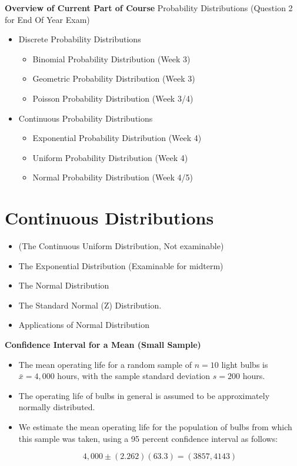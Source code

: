 \documentclass[]{report}
\begin{document}
{
\textbf{Overview of Current Part of Course}
Probability Distributions (Question 2 for End Of Year Exam)
\begin{itemize}
\item  Discrete Probability Distributions
\begin{itemize}
\item  Binomial Probability Distribution (Week 3)
\item  Geometric Probability Distribution (Week 3)
\item  Poisson Probability Distribution (Week 3/4)
\end{itemize}

\item  Continuous Probability Distributions
\begin{itemize}
\item  Exponential Probability Distribution (Week 4)
\item  Uniform Probability Distribution (Week 4)
\item  Normal Probability Distribution (Week 4/5)
\end{itemize}
\end{itemize}
}






\section{Continuous Distributions}
\begin{itemize}
\item  (The Continuous Uniform Distribution, Not examinable)
\item  The Exponential Distribution (Examinable for midterm)
\item  The Normal Distribution
\item  The Standard Normal (Z) Distribution.
\item  Applications of Normal Distribution
\end{itemize}


\textbf{Confidence Interval for a Mean (Small Sample)}
\begin{itemize}
\item  The mean operating life for a random sample of $n = 10$ light bulbs is $\bar{x} = 4,000$ hours, with the sample
standard deviation $s = 200$ hours. \item  The operating life of bulbs in general is assumed to be approximately normally distributed.\item 
We estimate the mean operating life for the population of bulbs from which this sample was taken, using a 95 percent
confidence interval as follows:

\[4,000\pm(2.262)(63.3)  = (3857,4143)\]
\end{itemize}
\end{document}
